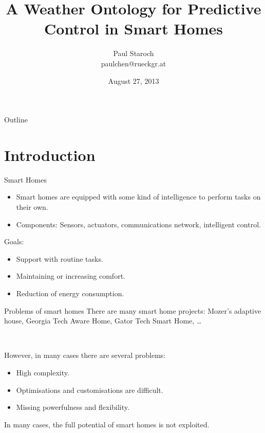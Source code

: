 \documentclass{beamer}
\title %
{A Weather Ontology for Predictive Control in Smart Homes}
\author[Paul Staroch] %
{Paul Staroch\\ {\scriptsize paulchen@rueckgr.at}} %
\institute[Vienna University of Technology] %
{
  Arbeitsgruppe Automatisierungssysteme\\
  Institut für Rechnergestützte Automation\\

  \hspace{5em}

  Supervisors:\\
  Ao.Univ.-Prof. Dipl.-Ing. Dr.techn. Wolfgang Kastner\\
  Dipl.-Ing. Mario Kofler

}
\date %
{August 27, 2013}
\begin{document}
\begin{frame}
  \titlepage
\end{frame}

\begin{frame}{Outline}
  \tableofcontents
\end{frame}




\section{Introduction}

\begin{frame}{Smart Homes}
	\begin{itemize}
		\item Smart homes are equipped with some kind of intelligence to perform tasks on their own.
		\item Components: Sensors, actuators, communications network, intelligent control.
	\end{itemize}

	Goals:
	\begin{itemize}
		\item Support with routine tasks.
		\item Maintaining or increasing comfort.
		\item Reduction of energy consumption.
	\end{itemize}
\end{frame}

\begin{frame}{Problems of smart homes}
	There are many smart home projects: Mozer's adaptive house, Georgia Tech Aware Home, Gator Tech Smart Home, …

	~

	However, in many cases there are several problems:
	\begin{itemize}
		\item High complexity.
		\item Optimisations and customisations are difficult.
		\item Missing powerfulness and flexibility.
	\end{itemize}

	In many cases, the full potential of smart homes is not exploited.
\end{frame}
\end{document}
